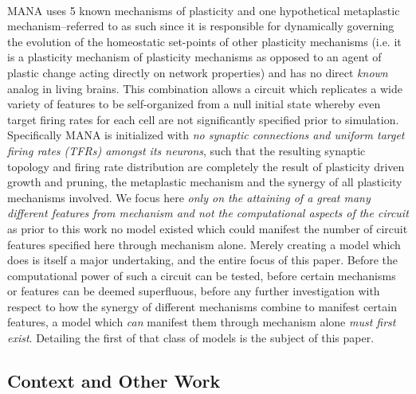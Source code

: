 \documentclass[10pt,letterpaper]{article}
\begin{document}
\paragraph{}
MANA uses 5 known mechanisms of plasticity and one hypothetical metaplastic mechanism--referred to as such since it is responsible for dynamically governing the evolution of the homeostatic set-points of other plasticity mechanisms (i.e. it is a plasticity mechanism of plasticity mechanisms as opposed to an agent of plastic change acting directly on network properties) and has no direct \emph{known} analog in living brains. This combination allows a circuit which replicates a wide variety of features to be self-organized from a null initial state whereby even target firing rates for each cell are not significantly specified prior to simulation. Specifically MANA is initialized with \emph{no synaptic connections and uniform target firing rates (TFRs) amongst its neurons}, such that the resulting synaptic topology and firing rate distribution are completely the result of plasticity driven growth and pruning, the metaplastic mechanism and the synergy of all plasticity mechanisms involved. We focus here \emph{only on the attaining of a great many different features from mechanism and not the computational aspects of the circuit} as prior to this work no model existed which could manifest the number of circuit features specified here through mechanism alone. Merely creating a model which does is itself a major undertaking, and the entire focus of this paper. Before the computational power of such a circuit can be tested, before certain mechanisms or features can be deemed superfluous, before any further investigation with respect to how the synergy of different mechanisms combine to manifest certain features, a model which \emph{can} manifest them through mechanism alone \emph{must first exist}. Detailing the first of that class of models is the subject of this paper.

\subsection*{Context and Other Work}
\end{document}
